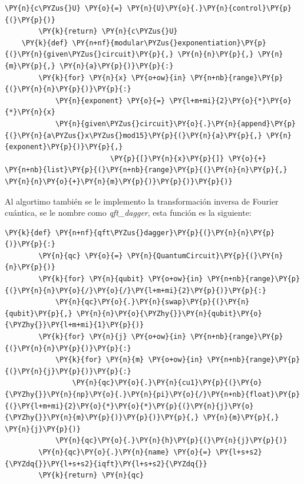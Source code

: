 \begin{tcolorbox}[breakable, size=fbox, boxrule=1pt, pad at break*=1mm,colback=cellbackground, colframe=cellborder]
\begin{Verbatim}[commandchars=\\\{\}]
        \PY{n}{c\PYZus{}U} \PY{o}{=} \PY{n}{U}\PY{o}{.}\PY{n}{control}\PY{p}{(}\PY{p}{)}
        \PY{k}{return} \PY{n}{c\PYZus{}U}
    \PY{k}{def} \PY{n+nf}{modular\PYZus{}exponentiation}\PY{p}{(}\PY{n}{given\PYZus{}circuit}\PY{p}{,} \PY{n}{n}\PY{p}{,} \PY{n}{m}\PY{p}{,} \PY{n}{a}\PY{p}{)}\PY{p}{:}
        \PY{k}{for} \PY{n}{x} \PY{o+ow}{in} \PY{n+nb}{range}\PY{p}{(}\PY{n}{n}\PY{p}{)}\PY{p}{:}
            \PY{n}{exponent} \PY{o}{=} \PY{l+m+mi}{2}\PY{o}{*}\PY{o}{*}\PY{n}{x}
            \PY{n}{given\PYZus{}circuit}\PY{o}{.}\PY{n}{append}\PY{p}{(}\PY{n}{a\PYZus{}x\PYZus{}mod15}\PY{p}{(}\PY{n}{a}\PY{p}{,} \PY{n}{exponent}\PY{p}{)}\PY{p}{,} 
                         \PY{p}{[}\PY{n}{x}\PY{p}{]} \PY{o}{+} \PY{n+nb}{list}\PY{p}{(}\PY{n+nb}{range}\PY{p}{(}\PY{n}{n}\PY{p}{,} \PY{n}{n}\PY{o}{+}\PY{n}{m}\PY{p}{)}\PY{p}{)}\PY{p}{)}
    \end{Verbatim}
    \end{tcolorbox}
Al algortimo también se le implemento la transformación inversa de Fourier cuántica, se le nombre como \textcolor{def}{\textit{qft\_dagger}}, esta función es la siguiente:
\begin{tcolorbox}[breakable, size=fbox, boxrule=1pt, pad at break*=1mm,colback=cellbackground, colframe=cellborder]
    \begin{Verbatim}[commandchars=\\\{\}]
    \PY{k}{def} \PY{n+nf}{qft\PYZus{}dagger}\PY{p}{(}\PY{n}{n}\PY{p}{)}\PY{p}{:}
        \PY{n}{qc} \PY{o}{=} \PY{n}{QuantumCircuit}\PY{p}{(}\PY{n}{n}\PY{p}{)}
        \PY{k}{for} \PY{n}{qubit} \PY{o+ow}{in} \PY{n+nb}{range}\PY{p}{(}\PY{n}{n}\PY{o}{/}\PY{o}{/}\PY{l+m+mi}{2}\PY{p}{)}\PY{p}{:}
            \PY{n}{qc}\PY{o}{.}\PY{n}{swap}\PY{p}{(}\PY{n}{qubit}\PY{p}{,} \PY{n}{n}\PY{o}{\PYZhy{}}\PY{n}{qubit}\PY{o}{\PYZhy{}}\PY{l+m+mi}{1}\PY{p}{)}
        \PY{k}{for} \PY{n}{j} \PY{o+ow}{in} \PY{n+nb}{range}\PY{p}{(}\PY{n}{n}\PY{p}{)}\PY{p}{:}
            \PY{k}{for} \PY{n}{m} \PY{o+ow}{in} \PY{n+nb}{range}\PY{p}{(}\PY{n}{j}\PY{p}{)}\PY{p}{:}
                \PY{n}{qc}\PY{o}{.}\PY{n}{cu1}\PY{p}{(}\PY{o}{\PYZhy{}}\PY{n}{np}\PY{o}{.}\PY{n}{pi}\PY{o}{/}\PY{n+nb}{float}\PY{p}{(}\PY{l+m+mi}{2}\PY{o}{*}\PY{o}{*}\PY{p}{(}\PY{n}{j}\PY{o}{\PYZhy{}}\PY{n}{m}\PY{p}{)}\PY{p}{)}\PY{p}{,} \PY{n}{m}\PY{p}{,} \PY{n}{j}\PY{p}{)}
            \PY{n}{qc}\PY{o}{.}\PY{n}{h}\PY{p}{(}\PY{n}{j}\PY{p}{)}
        \PY{n}{qc}\PY{o}{.}\PY{n}{name} \PY{o}{=} \PY{l+s+s2}{\PYZdq{}}\PY{l+s+s2}{iqft}\PY{l+s+s2}{\PYZdq{}}
        \PY{k}{return} \PY{n}{qc}
    \end{Verbatim}
    \end{tcolorbox}
